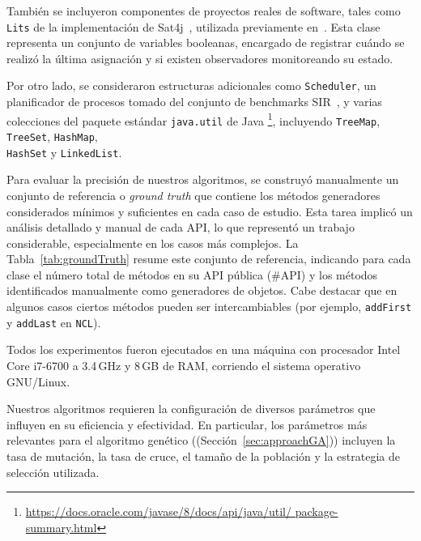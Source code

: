 También se incluyeron componentes de proyectos reales de software, tales como
\verb"Lits" de la implementación de Sat4j~\cite{sat4j}, utilizada previamente
en~\cite{Loncaric:2018}. Esta clase representa un conjunto de variables
booleanas, encargado de registrar cuándo se realizó la última asignación y si
existen observadores monitoreando su estado.

Por otro lado, se consideraron estructuras adicionales como \verb"Scheduler",
un planificador de procesos tomado del conjunto de benchmarks SIR~\cite{sir},
y varias colecciones del paquete estándar \verb"java.util" de Java%
\footnote{\url{https://docs.oracle.com/javase/8/docs/api/java/util/
package-summary.html}}, incluyendo \verb"TreeMap", \verb"TreeSet",
\verb"HashMap",\\
 \verb"HashSet" y \verb"LinkedList".

Para evaluar la precisión de nuestros algoritmos, se construyó manualmente un
conjunto de referencia o \emph{ground truth} que contiene los métodos
generadores considerados mínimos y suficientes en cada caso de estudio. Esta
tarea implicó un análisis detallado y manual de cada API, lo que representó un
trabajo considerable, especialmente en los casos más complejos. La
Tabla~\ref{tab:groundTruth} resume este conjunto de referencia, indicando para
cada clase el número total de métodos en su API pública (\#API) y los métodos
identificados manualmente como generadores de objetos. Cabe destacar que en algunos
casos ciertos métodos pueden ser intercambiables (por ejemplo,
\texttt{addFirst} y \texttt{addLast} en \texttt{NCL}).

Todos los experimentos fueron ejecutados en una máquina con procesador Intel
Core i7-6700 a 3.4\,GHz y 8\,GB de RAM, corriendo el sistema operativo
GNU/Linux.




Nuestros algoritmos requieren la configuración de diversos parámetros que influyen en su eficiencia y
efectividad. En particular, los parámetros más relevantes para el algoritmo
genético ((Sección~\ref{sec:approachGA})) incluyen la tasa de mutación, la tasa de cruce, el tamaño de la
población y la estrategia de selección utilizada.


